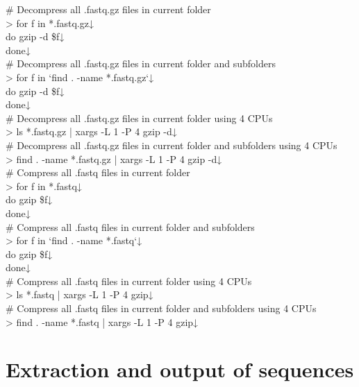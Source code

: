\documentclass[titlepage,10pt,a4paper,english]{jsbook}
\newenvironment{cmd}{\begin{oframed}\raggedright\ttfamily\footnotesize\setlength{\baselineskip}{1.4em}}{\end{oframed}\vspace{-1em}}
\begin{document}
\begin{cmd}
\# Decompress all .fastq.gz files in current folder\\
{\textgreater} for f in *.fastq.gz↓\\
do gzip -d \$f↓\\
done↓\\
\# Decompress all .fastq.gz files in current folder and subfolders\\
{\textgreater} for f in `find . -name *.fastq.gz`↓\\
do gzip -d \$f↓\\
done↓\\
\# Decompress all .fastq.gz files in current folder using 4 CPUs\\
{\textgreater} ls *.fastq.gz | xargs -L 1 -P 4 gzip -d↓\\
\# Decompress all .fastq.gz files in current folder and subfolders using 4 CPUs\\
{\textgreater} find . -name *.fastq.gz | xargs -L 1 -P 4 gzip -d↓\\
\# Compress all .fastq files in current folder\\
{\textgreater} for f in *.fastq↓\\
do gzip \$f↓\\
done↓\\
\# Compress all .fastq files in current folder and subfolders\\
{\textgreater} for f in `find . -name *.fastq`↓\\
do gzip \$f↓\\
done↓\\
\# Compress all .fastq files in current folder using 4 CPUs\\
{\textgreater} ls *.fastq | xargs -L 1 -P 4 gzip↓\\
\# Compress all .fastq files in current folder and subfolders using 4 CPUs\\
{\textgreater} find . -name *.fastq | xargs -L 1 -P 4 gzip↓
\end{cmd}

\section{Extraction and output of sequences}
\end{document}

